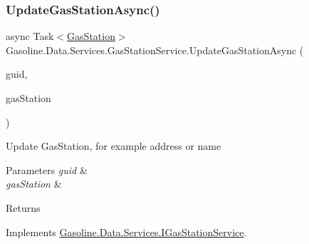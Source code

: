 \mbox{\label{class_gasoline_1_1_data_1_1_services_1_1_gas_station_service_a71d61038244d2ebd2543e76073c7ac91}} 
\subsubsection{\texorpdfstring{UpdateGasStationAsync()}{UpdateGasStationAsync()}}
{\footnotesize\ttfamily async Task$<$\mbox{\hyperlink{class_gasoline_1_1_data_1_1_models_1_1_gas_station}{Gas\+Station}}$>$ Gasoline.\+Data.\+Services.\+Gas\+Station\+Service.\+Update\+Gas\+Station\+Async (\begin{DoxyParamCaption}\item[{Guid}]{guid,  }\item[{\mbox{\hyperlink{class_gasoline_1_1_data_1_1_models_1_1_gas_station}{Gas\+Station}}}]{gas\+Station }\end{DoxyParamCaption})}



Update Gas\+Station, for example address or name 


\begin{DoxyParams}{Parameters}
{\em guid} & \\
\hline
{\em gas\+Station} & \\
\hline
\end{DoxyParams}
\begin{DoxyReturn}{Returns}

\end{DoxyReturn}


Implements \mbox{\hyperlink{interface_gasoline_1_1_data_1_1_services_1_1_i_gas_station_service_ae172cf0f9448fd6c9d24c2ced6b1afdc}{Gasoline.\+Data.\+Services.\+I\+Gas\+Station\+Service}}.

\mbox{\label{class_gasoline_1_1_data_1_1_services_1_1_gas_station_service_ac437b0ab0507030c7f91623fef829461}} 
